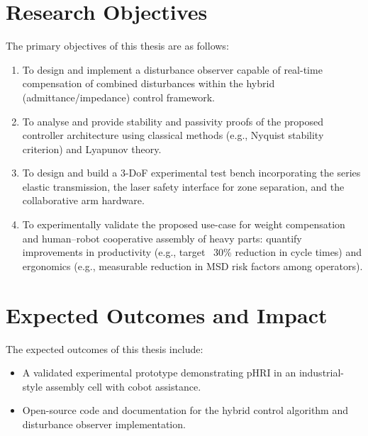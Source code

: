 \documentclass[11pt,a4paper]{article}
\begin{document}
\section*{Research Objectives}
The primary objectives of this thesis are as follows:
\begin{enumerate}
    \item To design and implement a disturbance observer capable of real-time compensation of combined disturbances within the hybrid (admittance/impedance) control framework.
    \item To analyse and provide stability and passivity proofs of the proposed controller architecture using classical methods (e.g., Nyquist stability criterion) and Lyapunov theory.
    \item To design and build a 3-DoF experimental test bench incorporating the series elastic transmission, the laser safety interface for zone separation, and the collaborative arm hardware.
    \item To experimentally validate the proposed use-case for weight compensation and human–robot cooperative assembly of heavy parts: quantify improvements in productivity (e.g., target ~30\% reduction in cycle times) and ergonomics (e.g., measurable reduction in MSD risk factors among operators).
\end{enumerate}

\section*{Expected Outcomes and Impact}
The expected outcomes of this thesis include:
\begin{itemize}
    \item A validated experimental prototype demonstrating pHRI in an industrial-style assembly cell with cobot assistance.
    \item Open-source code and documentation for the hybrid control algorithm and disturbance observer implementation.
\end{itemize}

\vspace{8mm}
\newpage
\printbibliography
\end{document}

